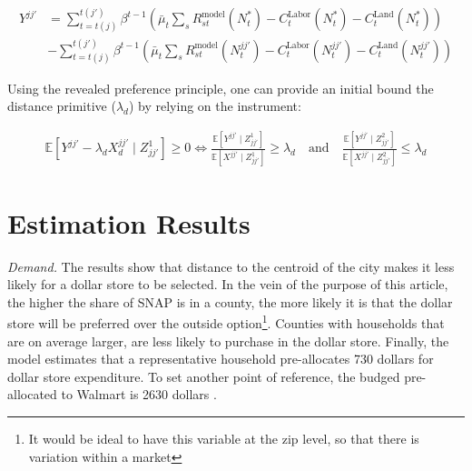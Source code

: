 \documentclass[11.5pt]{article}
\begin{document}
  \begin{align*}
      Y^{jj'} & =  \sum_{t=t(j)}^{t(j')}\beta^{t-1} \left(\bar \mu_t\sum_{s}   R_{st}^\text{model}(N_t^*)- C_t^\text{Labor} (N_t^*) - C_t^\text{Land} (N_t^*)\right)  \\
      & -  \sum_{t=t(j)}^{t(j')} \beta^{t-1} \left(\bar \mu_t\sum_{s}   R_{st}^\text{model}(N_t^{jj'}) - C_t^\text{Labor} (N_t^{jj'}) - C_t^\text{Land} (N_t^{jj'}) \right) 
  \end{align*}
  
  
  
  Using the revealed preference principle, one can provide an initial bound the distance primitive ($\lambda_d$) by relying on the instrument:
  


      \begin{align}
          \mathbb{E}[Y^{jj'}-\lambda_d X_d^{jj'} \mid Z^{1}_{jj'}] \geq 0 \iff \frac{\mathbb{E}[Y^{jj'}\mid Z^{1}_{jj'}]}{\mathbb{E}[X^{jj'}\mid Z^{1}_{jj'}]}\geq \lambda_d  \quad \text{and} \quad  \frac{\mathbb{E}[Y^{jj'}\mid Z^{2}_{jj'}]}{\mathbb{E}[X^{jj'}\mid Z^{2}_{jj'}]}\leq \lambda_d 
      \end{align}


    
     
     
     


\section{Estimation Results}
\textit{Demand.} The results show that distance to the centroid of the city makes it less likely for a dollar store to be selected. In the vein of the purpose of this article, the higher the share of SNAP is in a county, the more likely it is that the dollar store will be preferred over the outside option\footnote{It would be ideal to have this variable at the zip level, so that there is variation within a market}. Counties with households that are on average larger, are less likely to purchase in the dollar store. Finally, the model estimates that a representative household pre-allocates 730 dollars for dollar store expenditure. To set another point of reference, the budged pre-allocated to Walmart is 2630 dollars \cite{holmes2011diffusion}.
\end{document}
